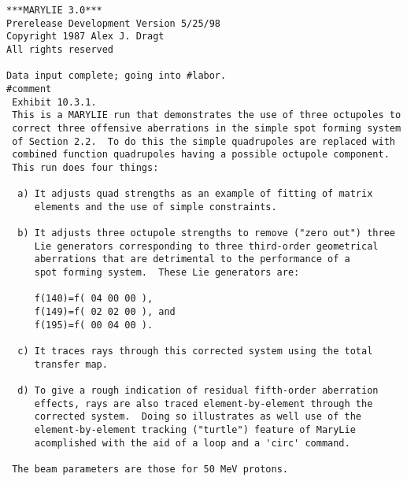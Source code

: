 \begin{footnotesize}
\begin{verbatim}
***MARYLIE 3.0***
Prerelease Development Version 5/25/98
Copyright 1987 Alex J. Dragt
All rights reserved

Data input complete; going into #labor.
#comment
 Exhibit 10.3.1.
 This is a MARYLIE run that demonstrates the use of three octupoles to
 correct three offensive aberrations in the simple spot forming system
 of Section 2.2.  To do this the simple quadrupoles are replaced with
 combined function quadrupoles having a possible octupole component.
 This run does four things:

  a) It adjusts quad strengths as an example of fitting of matrix
     elements and the use of simple constraints.

  b) It adjusts three octupole strengths to remove ("zero out") three
     Lie generators corresponding to three third-order geometrical
     aberrations that are detrimental to the performance of a
     spot forming system.  These Lie generators are:

     f(140)=f( 04 00 00 ),
     f(149)=f( 02 02 00 ), and
     f(195)=f( 00 04 00 ).

  c) It traces rays through this corrected system using the total
     transfer map.

  d) To give a rough indication of residual fifth-order aberration
     effects, rays are also traced element-by-element through the
     corrected system.  Doing so illustrates as well use of the
     element-by-element tracking ("turtle") feature of MaryLie
     acomplished with the aid of a loop and a 'circ' command.

 The beam parameters are those for 50 MeV protons.


\end{verbatim}
\end{footnotesize}
